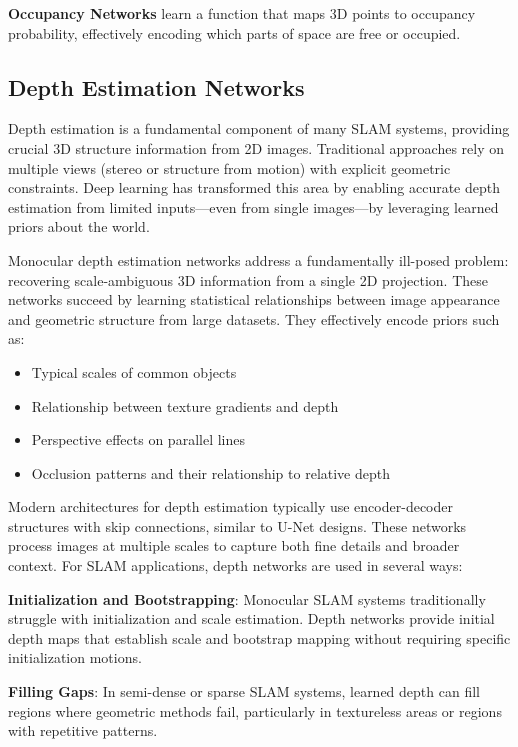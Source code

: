 \documentclass[12pt]{article}
\begin{document}
    \newpage
    \textbf{Occupancy Networks} learn a function that maps 3D points to occupancy probability, effectively encoding which parts of space are free or occupied.

    \newpage
    \subsection{Depth Estimation Networks}
    
    Depth estimation is a fundamental component of many SLAM systems, providing crucial 3D structure information from 2D images. Traditional approaches rely on multiple views (stereo or structure from motion) with explicit 
    geometric constraints. Deep learning has transformed this area by enabling accurate depth estimation from limited inputs—even from single images—by leveraging learned priors about the world.
    
    Monocular depth estimation networks address a fundamentally ill-posed problem: recovering scale-ambiguous 3D information from a single 2D projection. These networks succeed by learning statistical relationships between 
    image appearance and geometric structure from large datasets. They effectively encode priors such as:
    
    \begin{itemize}
        \item Typical scales of common objects
        \item Relationship between texture gradients and depth
        \item Perspective effects on parallel lines
        \item Occlusion patterns and their relationship to relative depth
    \end{itemize}
    
    \newpage

    Modern architectures for depth estimation typically use encoder-decoder structures with skip connections, similar to U-Net designs. These networks process images at multiple scales to capture both fine details and broader context.
    For SLAM applications, depth networks are used in several ways:
    
    \textbf{Initialization and Bootstrapping}: Monocular SLAM systems traditionally struggle with initialization and scale estimation. Depth networks provide initial depth maps that establish scale and bootstrap mapping without requiring 
    specific initialization motions.
    
    \textbf{Filling Gaps}: In semi-dense or sparse SLAM systems, learned depth can fill regions where geometric methods fail, particularly in textureless areas or regions with repetitive patterns.
    
\end{document}
